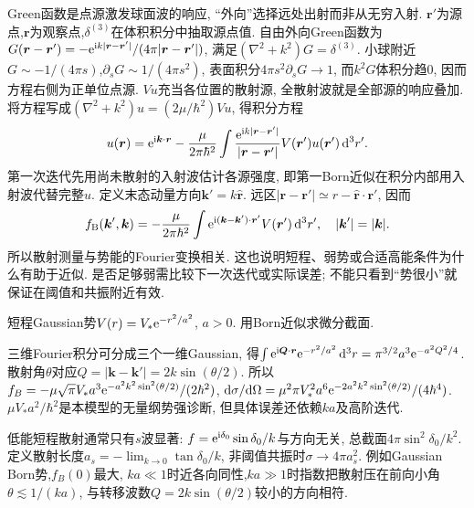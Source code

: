 Green函数是点源激发球面波的响应, “外向”选择远处出射而非从无穷入射. $\boldsymbol r\prime$为源点,$\boldsymbol r$为观察点,$\delta^{(3)}$在体积积分中抽取源点值. 自由外向Green函数为$G(\boldsymbol r-\boldsymbol r')=-\mathrm e^{\mathrm i k|\boldsymbol r-\boldsymbol r'|}/(4\pi|\boldsymbol r-\boldsymbol r'|)$, 满足$(\nabla^2+k^2)G=\delta^{(3)}$. 小球附近$G\sim-1/(4\pi s)$,$\partial_sG\sim1/(4\pi s^2)$, 表面积分$4\pi s^2\partial_sG\to1$, 而$k^2G$体积分趋0, 因而方程右侧为正单位点源. $Vu$充当各位置的散射源, 全散射波就是全部源的响应叠加. 将方程写成$(\nabla^2+k^2)u=(2\mu/\hbar^2)Vu$, 得积分方程
\[
u(\boldsymbol r)=\mathrm e^{\mathrm i\boldsymbol k\cdot\boldsymbol r}
-\frac{\mu}{2\pi\hbar^2}\int
\frac{\mathrm e^{\mathrm i k|\boldsymbol r-\boldsymbol r'|}}{|\boldsymbol r-\boldsymbol r'|}
V(\boldsymbol r')u(\boldsymbol r')\,\mathrm d^3r'.
\]
第一次迭代先用尚未散射的入射波估计各源强度, 即第一Born近似在积分内部用入射波代替完整$u$. 定义末态动量方向$\boldsymbol k'=k\widehat{\boldsymbol r}$. 远区$|\boldsymbol r-\boldsymbol r'|\simeq r-\widehat{\boldsymbol r}\cdot\boldsymbol r'$, 因而
\[
f_{\rm B}(\boldsymbol k',\boldsymbol k)
=-\frac{\mu}{2\pi\hbar^2}\int
\mathrm e^{\mathrm i(\boldsymbol k-\boldsymbol k')\cdot\boldsymbol r'}V(\boldsymbol r')\,\mathrm d^3r',
\quad |\boldsymbol k'|=|\boldsymbol k|.
\]
所以散射测量与势能的Fourier变换相关. 这也说明短程、弱势或合适高能条件为什么有助于近似. 是否足够弱需比较下一次迭代或实际误差; 不能只看到“势很小”就保证在阈值和共振附近有效.


\begin{example}
短程Gaussian势$V(r)=V_*\mathrm e^{-r^2/a^2}$, $a>0$. 用Born近似求微分截面.
\end{example}
\begin{solution}
三维Fourier积分可分成三个一维Gaussian, 得$\int\mathrm e^{\mathrm i\boldsymbol Q\cdot\boldsymbol r}\mathrm e^{-r^2/a^2}\,\mathrm d^3r=\pi^{3/2}a^3\mathrm e^{-a^2Q^2/4}$. 散射角$\theta$对应$Q=|\boldsymbol k-\boldsymbol k'|=2k\sin(\theta/2)$. 所以
$f_B=-\mu\sqrt\pi V_*a^3\mathrm e^{-a^2k^2\sin^2(\theta/2)}/(2\hbar^2)$,
$\mathrm d\sigma/\mathrm d\Omega=\mu^2\pi V_*^2a^6\mathrm e^{-2a^2k^2\sin^2(\theta/2)}/(4\hbar^4)$.
$\mu V_*a^2/\hbar^2$是本模型的无量纲势强诊断, 但具体误差还依赖$ka$及高阶迭代.
\end{solution}

低能短程散射通常只有$s$波显著: $f=\mathrm e^{\mathrm i\delta_0}\sin\delta_0/k$与方向无关, 总截面$4\pi\sin^2\delta_0/k^2$. 定义散射长度$a_s=-\lim_{k\to0}\tan\delta_0/k$, 非阈值共振时$\sigma\to4\pi a_s^2$. 例如Gaussian Born势,$f_B(0)$最大, $ka\ll1$时近各向同性,$ka\gg1$时指数把散射压在前向小角$\theta\lesssim1/(ka)$, 与转移波数$Q=2k\sin(\theta/2)$较小的方向相符.
